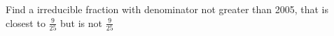 Find a irreducible fraction with denominator not greater than 2005, that is closest to $\frac{9}{25}$ but is not $\frac{9}{25}$